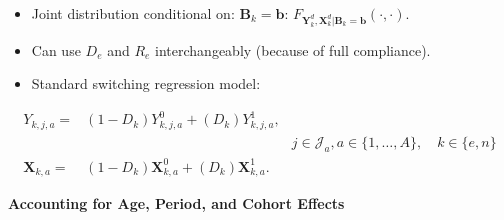 \documentclass[static]{JJH-Beamer}
\begin{document}
\begin{frame}

\begin{itemize}
\item Joint distribution conditional on: $\bm{B}_k = \bm{b}$: $F_{\bm{Y}_k^d, \bm{X}_k^d | \bm{B}_k = \bm{b}}(\cdot,\cdot)$.
\item Can use $D_e$ and $R_e$ interchangeably (because of full compliance).
\item Standard \citet{Quandt_1972_JASA} switching regression model:
\end{itemize}

\begin{align}\label{eq:countersystem}
Y_{k,j,a} =& \left( 1 - D_k \right) Y_{k,j,a}^0 + \left( D_k \right) Y_{k,j,a}^1, \\
&&j \in \mathcal{J}_a, a \in \{1,\dots,A\}, \quad k \in \{e,n\} \nonumber \\
\bm{X}_{k,a} =& \left( 1 - D_k \right) \bm{X}_{k,a}^0 + \left( D_k \right) \bm{X}_{k,a}^1. \nonumber
\end{align}

\end{frame}

\begin{frame}

\begin{center}
\textbf{Accounting for Age, Period, and Cohort Effects}
\end{center}

\end{frame}
\end{document}
